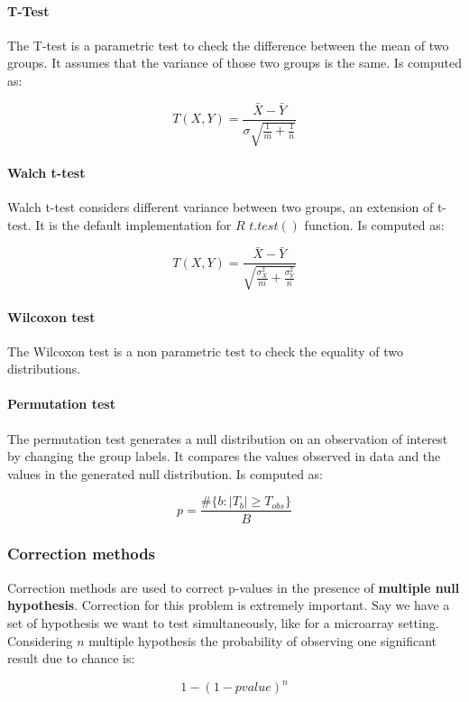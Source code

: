 			\paragraph{T-Test}

			The T-test is a parametric test to check the difference between the mean of two groups.
			It assumes that the variance of those two groups is the same.
			Is computed as:

			$$T(X, Y) = \frac{\bar{X}-\bar{Y}}{\sigma\sqrt{\frac{1}{m}+\frac{1}{n}}}$$

			\paragraph{Walch t-test}
			Walch t-test considers different variance between two groups, an extension of t-test.
			It is the default implementation for $R$ $t.test()$ function.
			Is computed as:

			$$T(X, Y) = \frac{\bar{X}-\bar{Y}}{\sqrt{\frac{\sigma^2_{X}}{m}+\frac{\sigma^2_Y}{n}}}$$

			\paragraph{Wilcoxon test}
			The Wilcoxon test is a non parametric test to check the equality of two distributions.

			\paragraph{Permutation test}
			The permutation test generates a null distribution on an observation of interest by changing the group labels.
			It compares the values observed in data and the values in the generated null distribution.
			Is computed as:

			$$p = \frac{\#\{b:|T_b|\ge T_{obs}\}}{B}$$

		\subsubsection{Correction methods}
		Correction methods are used to correct p-values in the presence of \textbf{multiple null hypothesis}.
		Correction for this problem is extremely important.
		Say we have a set of hypothesis we want to test simultaneously, like for a microarray setting.
		Considering $n$ multiple hypothesis the probability of observing one significant result due to chance is:

		$$1-(1-pvalue)^n$$

